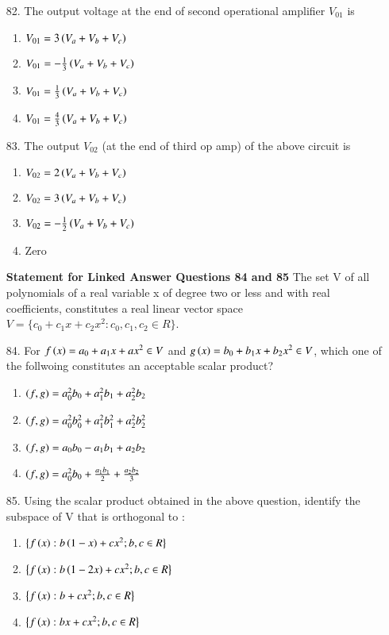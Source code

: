 \documentclass[journal]{IEEEtran}
\begin{document}
\begin{enumerate}
    \item[82.] The output voltage at the end of second operational amplifier $V_{01}$ is
    \begin{enumerate}[label=(\Alph*)]
        \item $V_{01}=3\left(V_a+V_b+V_c\right)$
        \item $V_{01}=-\frac{1}{3}\left(V_a+V_b+V_c\right)$
        \item $V_{01}=\frac{1}{3}\left(V_a+V_b+V_c\right)$
        \item $V_{01}=\frac{4}{3}\left(V_a+V_b+V_c\right)$
    \end{enumerate}
    \item[83.] The output $V_{02}$ (at the end of third op amp) of the above circuit is
    \begin{enumerate}[label=(\Alph*)]
        \item $V_{02}=2\left(V_a+V_b+V_c\right)$
        \item $V_{02}=3\left(V_a+V_b+V_c\right)$
        \item $V_{02}=-\frac{1}{2}\left(V_a+V_b+V_c\right)$
        \item Zero
    \end{enumerate}
    \textbf{Statement for Linked Answer Questions 84 and 85}
    The set V of all polynomials of a real variable x of degree two or less and with real coefficients, constitutes a real linear vector space $V=\{c_0 + c_1x + c_2 x^2 : c_0, c_1, c_2 \in R\}$.
    \item [84.] For $f \left(x\right) = a_0 + a_1x + ax^2 \in V$ and $g\left(x\right)=b_0+b_1x+b_2x^2 \in V$, which one of the follwoing constitutes an acceptable scalar product?
    \begin{enumerate}[label=(\Alph*)]
        \item $\left(f,g\right) = a_0^2b_0+a_1^2b_1+a_2^2b_2$
        \item $\left(f,g\right) = a_0^2b_0^2+a_1^2b_1^2+a_2^2b_2^2$
        \item $\left(f,g\right) = a_0b_0-a_1b_1+a_2b_2$
        \item $\left(f,g\right) = a_0^2b_0+\frac{a_1b_1}{2}+\frac{a_2b_2}{3}$
    \end{enumerate}
    \item[85.] Using the scalar product obtained in the above question, identify the subspace of V that is orthogonal to :
    \begin{enumerate}[label=(\Alph*)]
        \item $\bigl\{f\left(x\right):b\left(1-x\right)+cx^2;b,c\in R\bigr\}$
        \item  $\bigl\{f\left(x\right):b\left(1-2x\right)+cx^2;b,c\in R\bigr\}$
        \item  $\bigl\{f\left(x\right):b+cx^2;b,c\in R\bigr\}$
        \item  $\bigl\{f\left(x\right):bx+cx^2;b,c\in R\bigr\}$
    \end{enumerate}
\end{enumerate}
\end{document}
